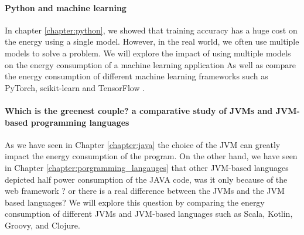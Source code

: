 \paragraph{Python and machine learning}
In chapter \ref{chapter:python}, we showed that training accuracy has a huge cost on the energy using a single model. However, in the real world, we often use multiple models to solve a problem. We will explore the impact of using multiple models on the energy consumption of a machine learning application As well as compare the energy consumption of different machine learning frameworks such as PyTorch, scikit-learn and TensorFlow .



\paragraph{ Which is the greenest couple? a comparative study of JVMs and JVM-based programming languages}
As we have seen in Chapter \ref{chapter:java} the choice of the JVM can greatly impact the energy consumption of the program. On the other hand, we have seen in Chapter \ref{chapter:porgramming_langauges} that other JVM-based languages depicted half power consumption of the JAVA code, was it only because of the web framework ? or there is a real difference between the JVMs and the JVM based languages? We will explore this question by comparing the energy consumption of different JVMs and JVM-based languages such as Scala, Kotlin, Groovy, and Clojure.

